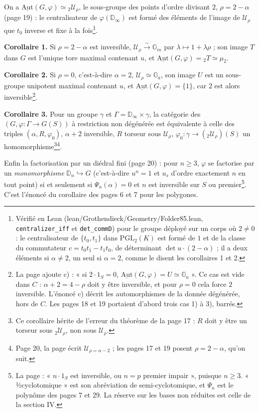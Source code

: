 \documentclass[11pt,a4paper]{article}
\begin{document}
On a $\underline{\mathrm{Aut}}(G, \varphi) \simeq {}_2\mathcal{U}_\rho$, le
sous-groupe des points d'ordre divisant $2$, $\rho = 2 - \alpha$ (page 19) :
le centralisateur de $\varphi(\mathbb{D}_\infty)$ est formé des éléments de
l'image de $\mathcal{U}_\rho$ que $t_0$ inverse et fixe à la fois\footnote{Vérifié en Lean (lean/Grothendieck/Geometry/Folder85.lean,
\texttt{centralizer\_iff} et \texttt{det\_commD}) pour le groupe déployé sur
un corps où $2 \neq 0$ : le centralisateur de $\{t_0, t_1\}$ dans
$\mathrm{PGL}_2(K)$ est formé de $1$ et de la classe du commutateur
$c = t_0t_1 - t_1t_0$, de déterminant $\det u \cdot (2 - \alpha)$ ; il a deux
éléments si $\alpha \neq 2$, un seul si $\alpha = 2$, comme le disent les
corollaires 1 et 2.}.

\textbf{Corollaire 1.} Si $\rho = 2 - \alpha$ est inversible, $\mathcal{U}_\rho
\xrightarrow{\sim} \mathbb{G}_m$ par $\lambda \mapsto 1 + \lambda\rho$ ; son
image $T$ dans $G$ est l'unique tore maximal contenant $u$, et
$\underline{\mathrm{Aut}}(G, \varphi) = {}_2T \simeq \mu_2$.

\textbf{Corollaire 2.} Si $\rho = 0$, c'est-à-dire $\alpha = 2$,
$\mathcal{U}_\rho \simeq \mathbb{G}_a$, son image $U$ est un sous-groupe
unipotent maximal contenant $u$, et $\underline{\mathrm{Aut}}(G, \varphi) =
\{1\}$, car $2$ est alors inversible\footnote{La page ajoute c) : « si $2
\cdot 1_S = 0$, $\underline{\mathrm{Aut}}(G, \varphi) = U \simeq \mathbb{G}_a$ ».
Ce cas est vide dans $C$ : $\alpha + 2 = 4 - \rho$ doit y être inversible, et
pour $\rho = 0$ cela force $2$ inversible. L'énoncé c) décrit les
automorphismes de la donnée dégénérée, hors de $C$. Les pages 18 et 19
portaient d'abord trois cas 1) à 3), barrés.}.

\textbf{Corollaire 3.} Pour un groupe $\gamma$ et $\Gamma = \mathbb{D}_\infty
\times \gamma$, la catégorie des $(G, \varphi : \Gamma \to G(S))$ à restriction
non dégénérée est équivalente à celle des triples $(\alpha, R, \varphi_0)$,
$\alpha + 2$ inversible, $R$ torseur sous $\mathcal{U}_\rho$, $\varphi_0 :
\gamma \to ({}_2\mathcal{U}_\rho)(S)$ un homomorphisme\footnote{Ce corollaire
hérite de l'erreur du théorème de la page 17 : $R$ doit y être un torseur sous
${}_2\mathcal{U}_\rho$, non sous $\mathcal{U}_\rho$.}\footnote{Page 20, la
page écrit $\mathcal{U}_{\rho = \alpha - 2}$ ; les pages 17 et 19 posent $\rho
= 2 - \alpha$, qu'on suit.}.

Enfin la factorisation par un diédral fini (page 20) : pour $n \geq 3$,
$\varphi$ se factorise par un \emph{monomorphisme} $\mathbb{D}_n
\hookrightarrow G$ (c'est-à-dire $u^n = 1$ et $u_s$ d'ordre exactement $n$ en
tout point) si et seulement si $\Psi_n(\alpha) = 0$ et $n$ est inversible sur
$S$ ou premier\footnote{La page : « $n \cdot 1_S$ est inversible, ou $n = p$
premier impair », puisque $n \geq 3$. « ½cyclotomique » est son abréviation
de semi-cyclotomique, et $\Psi_n$ est le polynôme des pages 7 et 29. La
réserve sur les bases non réduites est celle de la section IV.}. C'est
l'énoncé du corollaire des pages 6 et 7 pour les polygones.
\end{document}
